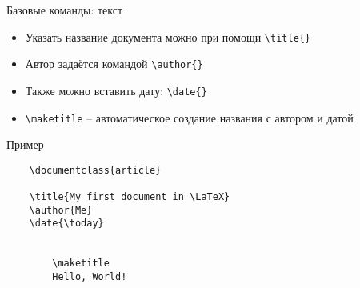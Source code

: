 
\begin{frame}[fragile]{Базовые команды: текст}

\begin{itemize}
    \item Указать название документа можно при помощи \lstinline!\title{}!
    \item Автор задаётся командой \lstinline!\author{}!
    \item Также можно вставить дату: \lstinline!\date{}!
    \item \lstinline!\maketitle! -- автоматическое создание названия 
    с автором и датой
\end{itemize}

\begin{block}{Пример}
    \begin{lstlisting}
    \documentclass{article}
    
    \title{My first document in \LaTeX}
    \author{Me}
    \date{\today}
    
    
        \maketitle
        Hello, World!
    
    \end{lstlisting}
\end{block}

\end{frame}
